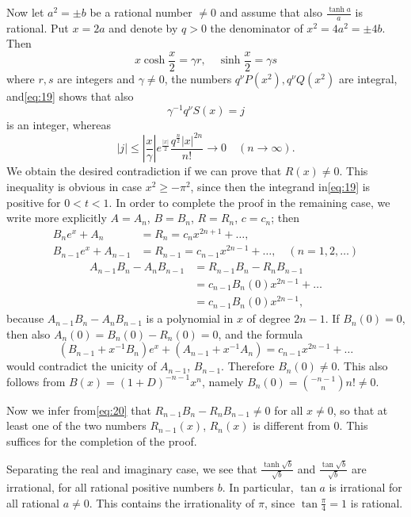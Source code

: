 Now let $a^2=\pm b$ be a rational number $\neq 0$ and assume that also $\frac{\tanh a}{a}$ is rational. Put $x=2a$ and denote by $q > 0$ the denominator of $x^2=4a^2=\pm 4b$. Then
\[ x\cosh \frac{x}{2}=\gamma r, \quad \sinh \frac{x}{2}=\gamma s \]
where $r, s$ are integers and $\gamma \neq 0$, the numbers $q^\nu P(x^2), q^\nu Q(x^2)$ are integral, and\eqref{eq:19} shows that also 
\[ \gamma^{-1} q^{\nu} S(x) = j \]
is an integer, whereas
\[ |j| \leq \left| \frac{x}{\gamma} \right| e^{\frac{|x|}{2}}  \frac{q^{\frac{n}{2}}|x|^{2n}}{n!} \longrightarrow 0 \quad (n \longrightarrow \infty). \]
We obtain the desired contradiction if we can prove that $R(x) \neq 0$. This inequality is obvious in case $x^2 \geq -\pi^2$, since then the integrand in\eqref{eq:19} is positive for $0 < t < 1$. In order to complete the proof in the remaining case, we write more explicitly $A=A_n$, $B=B_n$, $R=R_n$, $c=c_n$; then
\[ \begin{aligned} B_n e^{x} + A_n &= R_n = c_n x^{2n+1} + \dots, \\ B_{n-1} e^{x} + A_{n-1} &= R_{n-1} = c_{n-1} x^{2n-1} + \dots, \quad (n = 1, 2, \dots) \end{aligned} \]
\begin{equation} \begin{aligned} A_{n-1} B_n - A_n B_{n-1} &= R_{n-1} B_n - R_n B_{n-1} \\ &= c_{n-1} B_n(0) x^{2n-1} + \dots \\ &= c_{n-1} B_n(0) x^{2n-1}, \end{aligned} \tag{20}\label{eq:20} \end{equation}
because $A_{n-1} B_n - A_n B_{n-1}$ is a polynomial in $x$ of degree $2n-1$. If $B_n(0) = 0$, then also $A_n(0) = B_n(0) - R_n(0) = 0$, and the formula
\[ (B_{n-1} + x^{-1}B_n)e^{x} + (A_{n-1} + x^{-1}A_n) = c_{n-1}x^{2n-1} + \dots \]
would contradict the unicity of $A_{n-1}$, $B_{n-1}$. Therefore $B_n(0) \neq 0$. This also follows from $B(x) = (1+D)^{-n-1}x^n$, namely $B_{n}(0)= \binom{-n-1}{n}n! \neq 0$.

Now we infer from\eqref{eq:20} that $R_{n-1}B_n - R_nB_{n-1} \neq 0$ for all $x \neq 0$, so that at least one of the two numbers $R_{n-1}(x)$, $R_n(x)$ is different from 0. This suffices for the completion of the proof.

Separating the real and imaginary case, we see that $\frac{\tanh \sqrt{b}}{\sqrt{b}}$ and $\frac{\tan \sqrt{b}}{\sqrt{b}}$ are irrational, for all rational positive numbers $b$. In particular, $\tan a$ is irrational for all rational $a \neq 0$. This contains the irrationality of $\pi$, since $\tan \frac{\pi}{4} = 1$ is rational.


